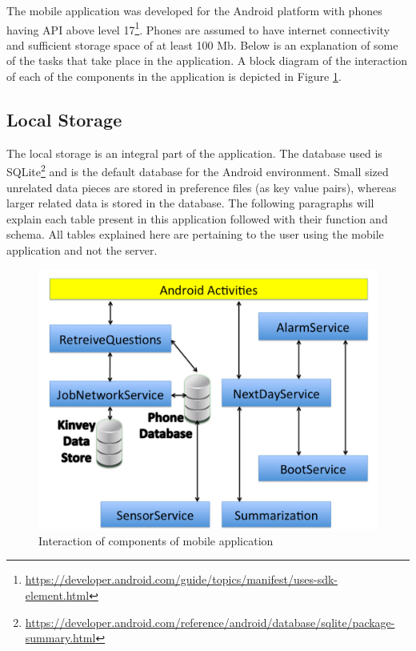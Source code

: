 The mobile application was developed for the Android platform with phones having API above level 17\footnote{\url{https://developer.android.com/guide/topics/manifest/uses-sdk-element.html}}. Phones are assumed to have internet connectivity and sufficient storage space of at least 100 Mb.
Below is an explanation of some of the tasks that take place in the application. A block diagram of the interaction of each of the components in the application is depicted in Figure \ref{fig:chap5_app}.

\subsection{Local Storage} \label{loc}
The local storage is an integral part of the application. The database used is SQLite\footnote{\url{https://developer.android.com/reference/android/database/sqlite/package-summary.html}} and is the default database
for the Android environment. Small sized unrelated data pieces are stored in preference files (as key value pairs), whereas larger related
data is stored in the database. The following paragraphs will explain each table present in this application followed with 
their function and schema. All tables explained here are pertaining to the user using the mobile application and not the server.

\begin{figure}[ht!]
\centering
\includegraphics[width=\textwidth,keepaspectratio]{./images/chap1}
\caption{Interaction of components of mobile application}
\label{fig:chap5_app}
\end{figure}

